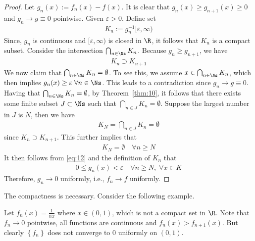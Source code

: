 \documentclass[thmcnt=section, 12pt]{elegantbook}
\begin{document}
\begin{proof}
    Let $g_n(x) := f_n(x) - f(x)$. It is clear that $g_n(x) \geq g_{n+1}(x) \geq 0$ and $g_n \to g \equiv 0$ pointwise. Given $\varepsilon > 0$. Define set
    \begin{align*}
        K_n := g_n^{-1}[\varepsilon, \infty)
    \end{align*}
    Since, $g_n$ is continuous and $[\varepsilon, \infty)$ is closed in $\R$, it follows that $K_n$ is a compact subset. Consider the intersection $\bigcap_{n \in \Ns} K_n$. Because $g_n \geq g_{n+1}$, we have
    \begin{align*}
        K_{n} \supset K_{n+1}
    \end{align*}
    We now claim that $\bigcap_{n \in \Ns} K_n = \emptyset$. To see this, we assume $x \in \bigcap_{n \in \Ns} K_n$, which then implies $g_n(x) \geq \varepsilon \; \forall n \in \Ns$. This leads to a contradiction since $g_n \to g \equiv 0$. Having that $\bigcap_{n \in \Ns} K_n = \emptyset$, by Theorem~\ref{thm:10}, it follows that there exists some finite subset $J \subset \Ns$ such that $\bigcap_{n \in J} K_n = \emptyset$. Suppose the largest number in $J$ is $N$, then we have
    \begin{align*}
        K_N = \bigcap_{n \in J} K_n = \emptyset 
    \end{align*}
    since $K_n \supset K_{n+1}$. This further implies that
    \begin{align}
        K_N = \emptyset \quad \forall n \geq N
        \label{eq:12}
    \end{align}
    It then follows from \eqref{eq:12} and the definition of $K_n$ that 
    \begin{align*}
        0 \leq g_n(x) < \varepsilon \quad \forall n \geq N, \; \forall x \in K
    \end{align*}
    Therefore, $g_n \to 0$ uniformly, i.e., $f_n \to f$ uniformly.
\end{proof}

\par The compactness is necessary. Consider the following example.

\begin{example}
    Let $f_n(x) = \frac{1}{nx}$ where $x \in (0,1)$, which is not a compact set in $\R$. Note that $f_n \to 0$ pointwise, all functions are continuous and $f_n(x) > f_{n+1}(x)$. But clearly $\left\{f_n\right\}$ does not converge to $0$ uniformly on $(0,1)$.
\end{example}
\end{document}
